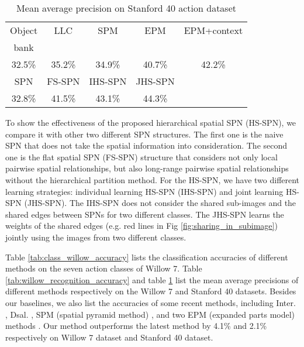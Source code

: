 \documentclass[journal]{IEEEtran}
\begin{document}
\begin{table}[h!]
		\caption{Mean average precision on Stanford 40 action dataset}
	\begin{center}

		\begin{tabular}{c c c c c}
			\hline

			\hline
			Object & LLC & SPM  & EPM  & EPM+context \\
			bank \cite{obect_bank} & \cite{LLC} & \cite{Lazebnik_beyond_cvpr2006} & \cite{sharma:CVPR2013} & \cite{sharma:CVPR2013}\\
			\hline

			32.5\% & 35.2\% & 34.9\% & 40.7\% & 42.2\% \\
			\hline
			\hline

			\hline
			SPN & FS-SPN & IHS-SPN & JHS-SPN & \\ \hline
			32.8\% & 41.5\% & 43.1\% & 44.3\% &  \\ \hline

			\hline

		\end{tabular}

	\end{center}



	\label{tab:stanford_recognition_accuracy}
\end{table}




To show the effectiveness of the proposed hierarchical spatial SPN (HS-SPN), we compare it with other two different SPN structures. The first one is the naive SPN that does not take the spatial information into consideration. The second one is the flat spatial SPN (FS-SPN) structure that considers not only local pairwise spatial relationships, but also long-range pairwise spatial relationships without the hierarchical partition method. For the HS-SPN, we have two different learning strategies: individual learning HS-SPN (IHS-SPN) and joint learning HS-SPN (JHS-SPN). The IHS-SPN does not consider the shared sub-images and the shared edges between SPNs for two different classes. The JHS-SPN learns the weights of the shared edges (e.g. red lines in Fig \ref{fig:sharing_in_subimage}) jointly using the images from two different classes.

Table \ref{tab:class_willow_accuracy} lists the classification accuracies of different methods on the seven action classes of Willow 7.
Table \ref{tab:willow_recognition_accuracy} and table \ref{tab:stanford_recognition_accuracy} list the mean average precisions of different methods respectively on the Willow 7 and Stanford 40 datasets. Besides our baselines, we also list the accuracies of some recent methods, including Inter. \cite{Delaitre11learningperson-object}, Dsal. \cite{sharma:CVPR2012_Discriminative}, SPM (spatial pyramid method) \cite{Lazebnik_beyond_cvpr2006}, and two EPM (expanded parts model) methods \cite{sharma:CVPR2013}. Our method outperforms the latest method \cite{sharma:CVPR2013} by 4.1\% and 2.1\% respectively on Willow 7 dataset and Stanford 40 dataset.
\end{document}
